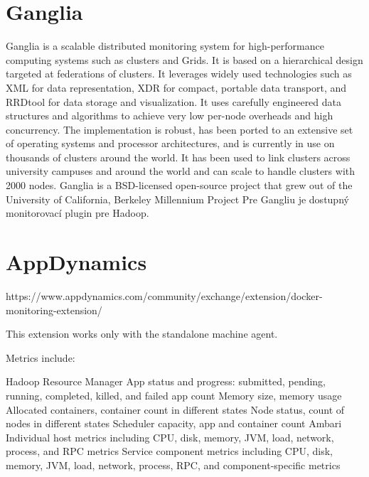 \documentclass[11pt,final,oneside]{fithesis}
\begin{document}
\section{Ganglia} 
Ganglia is a scalable distributed monitoring system for high-performance computing systems such as clusters and Grids. It is based on a hierarchical design targeted at federations of clusters. 
It leverages widely used technologies such as XML for data representation, XDR for compact, portable data transport, and RRDtool for data storage and visualization. 
It uses carefully engineered data structures and algorithms to achieve very low per-node overheads and high concurrency. 
The implementation is robust, has been ported to an extensive set of operating systems and processor architectures, and is currently in use on thousands of clusters around the world. 
It has been used to link clusters across university campuses and around the world and can scale to handle clusters with 2000 nodes.
Ganglia is a BSD-licensed open-source project that grew out of the University of California, Berkeley Millennium Project
\cite{15}
Pre Gangliu je dostupný monitorovací plugin pre Hadoop.
\cite{16}


\section{AppDynamics}
https://www.appdynamics.com/community/exchange/extension/docker-monitoring-extension/

This extension works only with the standalone machine agent.


Metrics include:

Hadoop Resource Manager
App status and progress: submitted, pending, running, completed, killed, and failed app count
Memory size, memory usage
Allocated containers, container count in different states
Node status, count of nodes in different states
Scheduler capacity, app and container count
Ambari
Individual host metrics including CPU, disk, memory, JVM, load, network, process, and RPC metrics
Service component metrics including CPU, disk, memory, JVM, load, network, process, RPC, and component-specific metrics
\cite{17}
\end{document}
